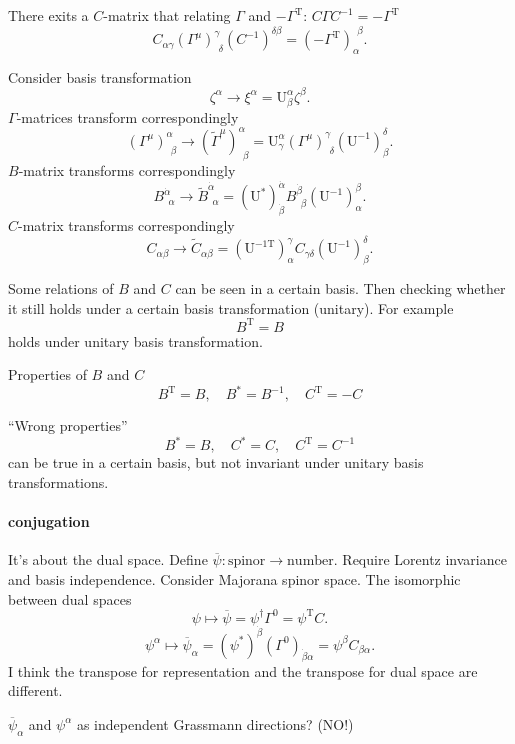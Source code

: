 There exits a $C$-matrix that relating $\Gamma$ and $-\Gamma^{\text{T}}$:
$ C \Gamma C^{-1} = - \Gamma^{\text{T}}$
\[
	C_{\alpha \gamma} (\Gamma^\mu)^{\gamma}_{~~\delta} (C^{-1})^{\delta\beta}
	= (-\Gamma^{\text{T}})_\alpha^{~~\beta}
.\] 

\begin{correct}
Consider basis transformation
\[
\zeta^\alpha \to \xi^\alpha = \mathrm{U}^\alpha_\beta \zeta^\beta
.\] 
$\Gamma$-matrices transform correspondingly
\[
	(\Gamma^\mu)^\alpha_{~~\beta} \to (\tilde{\Gamma}^\mu)^\alpha_{~~\beta}=
	\mathrm{U}^\alpha_\gamma (\Gamma^\mu)^\gamma_{~~\delta}
	(\mathrm{U}^{-1})^\delta_\beta
.\] 
$B$-matrix transforms correspondingly
\[
	B^{\dot{\alpha}}_{~~\alpha}
	\to \tilde{B}^{\dot{\alpha}}_{~~\alpha}
	= (\mathrm{U}^*)^{\dot{\alpha}}_{\dot{\beta}}B^{\dot{\beta}}_{~~\beta}
	(\mathrm{U}^{-1})^\beta_\alpha
.\] 
$C$-matrix transforms correspondingly
\[
	C_{\alpha \beta}\to\tilde{C}_{\alpha\beta}
	= (\mathrm{U}^{-1 \text{T}})_\alpha^\gamma
	C_{\gamma \delta} (\mathrm{U}^{-1})^\delta_\beta
.\] 

Some relations of $B$ and $C$ can be seen in a certain basis.
Then checking whether it still holds under a certain basis transformation
(unitary).
For example
\[
	B^{\text{T}} = B
\] 
holds under unitary basis transformation.

Properties of $B$ and $C$
\begin{equation}
	B^{\text{T}} = B ,\quad B^* = B^{-1},\quad C^{\text{T}} = -C
\end{equation}

``Wrong properties''
\[
	B^* = B,\quad C^* = C,\quad C^{\text{T}} = C^{-1}
\] 
can be true in a certain basis,
but not invariant under unitary basis transformations.
\end{correct}

\paragraph{conjugation}
It's about the dual space.
Define $\overline{\psi}:\text{spinor} \to \text{number}$.
Require Lorentz invariance and basis independence.
Consider Majorana spinor space.
The isomorphic between dual spaces
\[
	\psi \mapsto \overline{\psi} = \psi^\dagger \Gamma^0 = \psi^{\text{T}} C
.\] 
\[
	\psi^\alpha \mapsto \overline{\psi}_\alpha = 
	(\psi^*)^{\dot{\beta}} (\Gamma^0)_{\dot{\beta}\alpha}
	= \psi^\beta C_{\beta \alpha}
.\] 
I think the transpose for representation and the transpose for dual space
are different.
\begin{problem}
	$\overline{\psi}_\alpha$ and $\psi^\alpha$ 
	as independent Grassmann directions?
	(NO!)
\end{problem}
